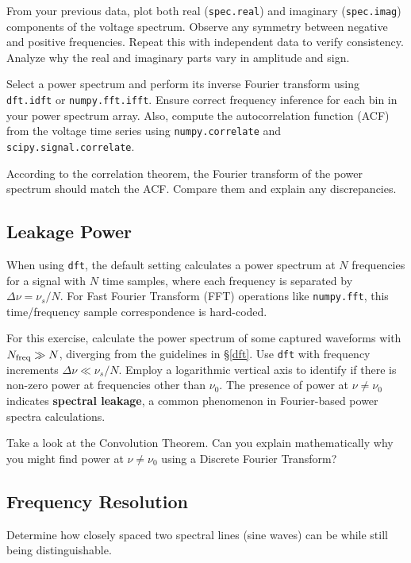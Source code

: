 \documentclass[11pt,preprint]{aastex}
\begin{document}
From your previous data, plot both real ({\tt spec.real}) and imaginary ({\tt spec.imag}) components of the voltage spectrum. Observe any symmetry between negative and positive frequencies. Repeat this with independent data to verify consistency. Analyze why the real and imaginary parts vary in amplitude and sign.

Select a power spectrum and perform its inverse Fourier transform using {\tt dft.idft} or {\tt numpy.fft.ifft}. Ensure correct frequency inference for each bin in your power spectrum array. Also, compute the autocorrelation function (ACF) from the voltage time series using {\tt numpy.correlate} and {\tt scipy.signal.correlate}. 

According to the correlation theorem, the Fourier transform of the power spectrum should match the ACF. Compare them and explain any discrepancies.


\subsection{Leakage Power} \label{subleakage}

\noindent
When using {\tt dft}, the default setting calculates a power spectrum at $N$ frequencies for a signal with $N$ time samples, where each frequency is separated by $\Delta\nu = \nu_s/N$. 
For Fast Fourier Transform (FFT) operations like {\tt numpy.fft}, this time/frequency sample correspondence is hard-coded.

For this exercise, calculate the power spectrum of some captured waveforms with $N_{\rm freq}\gg N$, diverging from the guidelines in \S \ref{dft}.
Use {\tt dft} with frequency increments $\Delta \nu \ll \nu_s/N$. Employ a logarithmic vertical axis to identify if there is non-zero power at frequencies other than $\nu_0$. The presence of power at $\nu\ne\nu_0$ indicates \textbf{spectral leakage}, a common phenomenon in Fourier-based power spectra calculations. 

Take a look at the Convolution Theorem. Can you explain mathematically why you might find power at $\nu\ne\nu_0$ using a Discrete Fourier Transform?


\subsection{Frequency Resolution} \label{freqres}

\noindent
Determine how closely spaced two spectral lines (sine waves) can be while still being distinguishable.
\end{document}
